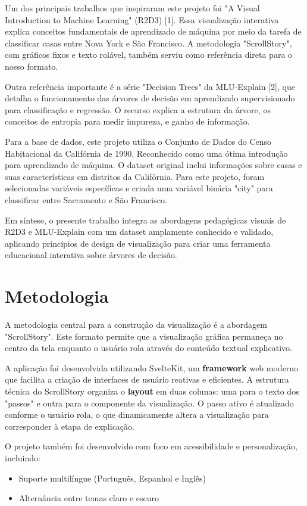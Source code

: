 \documentclass[conference]{IEEEtran}
\begin{document}
Um dos principais trabalhos que inspiraram este projeto foi "A Visual Introduction to Machine Learning" (R2D3) [1]. Essa visualização interativa explica conceitos fundamentais de aprendizado de máquina por meio da tarefa de classificar casas entre Nova York e São Francisco. A metodologia "ScrollStory", com gráficos fixos e texto rolável, também serviu como referência direta para o nosso formato.

Outra referência importante é a série "Decision Trees" da MLU-Explain [2], que detalha o funcionamento das árvores de decisão em aprendizado supervisionado para classificação e regressão. O recurso explica a estrutura da árvore, os conceitos de entropia para medir impureza, e ganho de informação.

Para a base de dados, este projeto utiliza o Conjunto de Dados do Censo Habitacional da Califórnia de 1990. Reconhecido como uma ótima introdução para aprendizado de máquina. O dataset original inclui informações sobre casas e suas características em distritos da Califórnia. Para este projeto, foram selecionadas variáveis específicas e criada uma variável binária "city" para classificar entre Sacramento e São Francisco.

Em síntese, o presente trabalho integra as abordagens pedagógicas visuais de R2D3 e MLU-Explain com um dataset amplamente conhecido e validado, aplicando princípios de design de visualização para criar uma ferramenta educacional interativa sobre árvores de decisão.


\section{Metodologia}
A metodologia central para a construção da visualização é a abordagem "ScrollStory". Este formato permite que a visualização gráfica permaneça no centro da tela enquanto o usuário rola através do conteúdo textual explicativo.

A aplicação foi desenvolvida utilizando SvelteKit, um \textbf{framework} web moderno que facilita a criação de interfaces de usuário reativas e eficientes. A estrutura técnica do ScrollStory organiza o \textbf{layout} em duas colunas: uma para o texto dos "passos" e outra para o componente da visualização. O passo ativo é atualizado conforme o usuário rola, o que dinamicamente altera a visualização para corresponder à etapa de explicação.

O projeto também foi desenvolvido com foco em acessibilidade e personalização, incluindo:
\begin{itemize}
    \item Suporte multilíngue (Português, Espanhol e Inglês)
    \item Alternância entre temas claro e escuro
\end{itemize}
\end{document}
